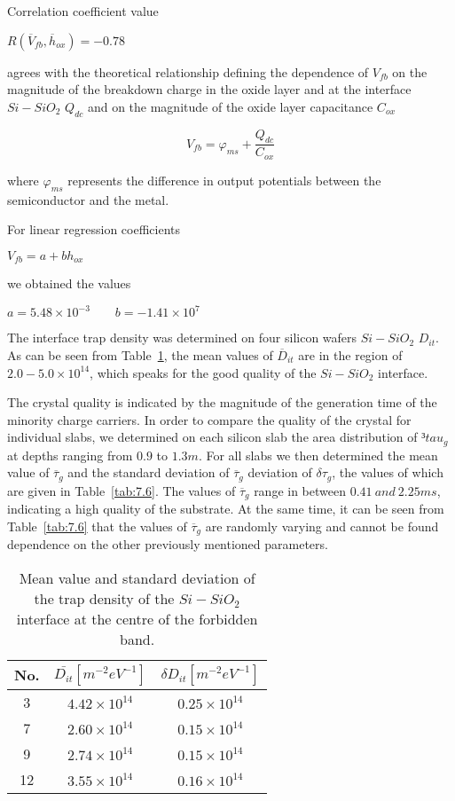 Correlation coefficient value

\centerline{$R(\overline V_{fb} ,\overline h_{ox}) = -0.78$}

agrees with the theoretical relationship defining the dependence of
$V_{fb}$ on the magnitude of the breakdown charge in the oxide layer
and at the interface $Si-SiO_{2}$ $Q_{dc}$ and on the magnitude of the
oxide layer capacitance $C_{ox}$

\begin{equation}\label{eq:7.3}
  V_{fb}  = \varphi_{ms} + \frac{Q_{dc}}{C_{ox}}
\end{equation}

where $\varphi_{ms}$ represents the difference in output potentials
between the semiconductor and the metal.

For linear regression coefficients

\centerline{$V_{fb}  = a + b h_{ox}$}

we obtained the values

\centerline{$a = 5.48 \times 10^{-3} \qquad b = -1.41 \times 10^{7}$}

The interface trap density was determined on four silicon wafers
$Si-SiO_2$ $D_{it}$. As can be seen from Table~\ref{tab:7.5}, the mean
values of $\overline D_{it}$ are in the region of $2.0-5.0\times
10^{14}$, which speaks for the good quality of the $Si-SiO_{2}$
interface.

The crystal quality is indicated by the magnitude of the generation
time of the minority charge carriers. In order to compare the quality
of the crystal for individual slabs, we determined on each silicon
slab the area distribution of $³tau_{g}$ at depths ranging from $0.9$
to $1.3 m$. For all slabs we then determined the mean value of
$\overline\tau_{g}$ and the standard deviation of $\overline\tau_{g}$
deviation of $\delta\tau_{g}$, the values of which are given in
Table~\ref{tab:7.6}. The values of $\overline\tau_{g}$ range in
between $0.41\ and\ 2.25 ms$, indicating a high quality of the
substrate. At the same time, it can be seen from Table~\ref{tab:7.6}
that the values of $\overline \tau_{g}$ are randomly varying and
cannot be found dependence on the other previously mentioned
parameters.

\begin{table}[h!]\centering
  \begin{tabular}{c c c}
    No. & ${\bar{D_{it}}}[m^{-2}eV^{-1}]$ & $\delta D_{it}[m^{-2}eV^{-1}]$\\
    \hline
    3 & $4.42 \times 10^{14}$ & $0.25 \times 10^{14}$\\
    7 & $2.60 \times 10^{14}$ & $0.15 \times 10^{14}$\\
    9 & $2.74 \times 10^{14}$ & $0.15 \times 10^{14}$\\
    12 & $3.55 \times 10^{14}$ & $0.16 \times 10^{14}$\\
  \end{tabular}
  \caption[Mean and standard deviation of trap densities of the
    $Si-SiO_{2}$ interface at the center of the forbidden band.]{Mean
    value and standard deviation of the trap density of the
    $Si-SiO_{2}$ interface at the centre of the forbidden
    band.}\label{tab:7.5}
\end{table}

